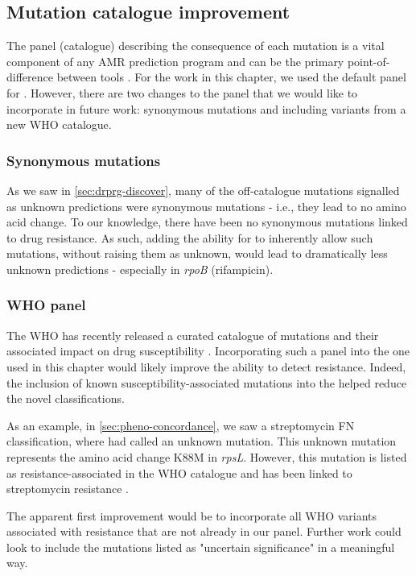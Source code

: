 \subsection{Mutation catalogue improvement}

The panel (catalogue) describing the consequence of each mutation is a vital component of any AMR prediction program and can be the primary point-of-difference between tools \cite{hunt2019}. For the work in this chapter, we used the default \mykrobe{} panel for \drprg{}. However, there are two changes to the \drprg{} panel that we would like to incorporate in future work: synonymous mutations and including variants from a new WHO catalogue.

\subsubsection{Synonymous mutations}

As we saw in \autoref{sec:drprg-discover}, many of the off-catalogue mutations signalled as unknown predictions were synonymous mutations - i.e., they lead to no amino acid change. To our knowledge, there have been no synonymous mutations linked to \mtb{} drug resistance. As such, adding the ability for \drprg{} to inherently allow such mutations, without raising them as unknown, would lead to dramatically less unknown predictions - especially in \textit{rpoB} (rifampicin).

\subsubsection{WHO panel}

The WHO has recently released a curated catalogue of \mtb{} mutations and their associated impact on drug susceptibility \cite{whopanel2021}. Incorporating such a panel into the one used in this chapter would likely improve the ability to detect resistance. Indeed, the inclusion of known susceptibility-associated mutations into the \drprg{} helped reduce the novel classifications.

As an example, in \autoref{sec:pheno-concordance}, we saw a streptomycin FN classification, where \drprg{} had called an unknown mutation. This unknown mutation represents the amino acid change K88M in \textit{rpsL}. However, this mutation is listed as resistance-associated in the WHO catalogue and has been linked to streptomycin resistance \cite{Smittipat2016}.

The apparent first improvement would be to incorporate all WHO variants associated with resistance that are not already in our panel. Further work could look to include the mutations listed as "uncertain significance" in a meaningful way.

